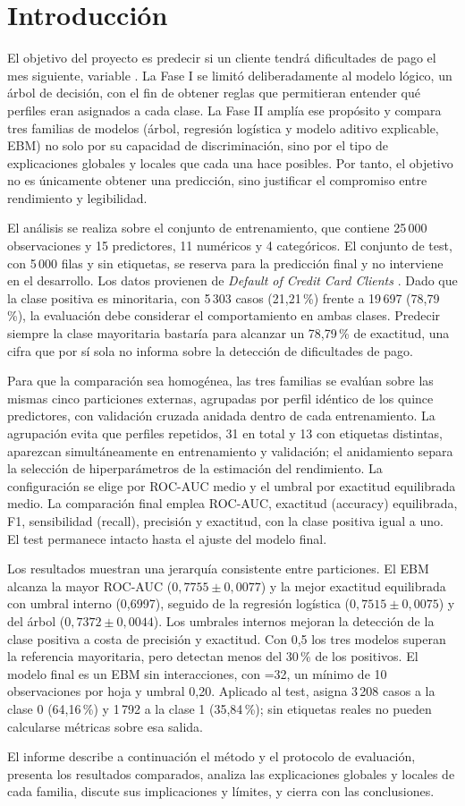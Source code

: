 \section{Introducción}\label{sec:intro}

El objetivo del proyecto es predecir si un cliente tendrá dificultades de pago el mes siguiente, variable . La Fase I se limitó deliberadamente al modelo lógico, un árbol de decisión, con el fin de obtener reglas que permitieran entender qué perfiles eran asignados a cada clase. La Fase II amplía ese propósito y compara tres familias de modelos (árbol, regresión logística y modelo aditivo explicable, EBM) no solo por su capacidad de discriminación, sino por el tipo de explicaciones globales y locales que cada una hace posibles. Por tanto, el objetivo no es únicamente obtener una predicción, sino justificar el compromiso entre rendimiento y legibilidad.

El análisis se realiza sobre el conjunto de entrenamiento, que contiene 25\,000 observaciones y 15 predictores, 11 numéricos y 4 categóricos. El conjunto de test, con 5\,000 filas y sin etiquetas, se reserva para la predicción final y no interviene en el desarrollo. Los datos provienen de \emph{Default of Credit Card Clients} \cite{uci}. Dado que la clase positiva es minoritaria, con 5\,303 casos (21,21\,\%) frente a 19\,697 (78,79\,\%), la evaluación debe considerar el comportamiento en ambas clases. Predecir siempre la clase mayoritaria bastaría para alcanzar un 78,79\,\% de exactitud, una cifra que por sí sola no informa sobre la detección de dificultades de pago.

Para que la comparación sea homogénea, las tres familias se evalúan sobre las mismas cinco particiones externas, agrupadas por perfil idéntico de los quince predictores, con validación cruzada anidada dentro de cada entrenamiento. La agrupación evita que perfiles repetidos, 31 en total y 13 con etiquetas distintas, aparezcan simultáneamente en entrenamiento y validación; el anidamiento separa la selección de hiperparámetros de la estimación del rendimiento. La configuración se elige por ROC-AUC medio y el umbral por exactitud equilibrada medio. La comparación final emplea ROC-AUC, exactitud (accuracy) equilibrada, F1, sensibilidad (recall), precisión y exactitud, con la clase positiva igual a uno. El test permanece intacto hasta el ajuste del modelo final.

Los resultados muestran una jerarquía consistente entre particiones. El EBM alcanza la mayor ROC-AUC ($0{,}7755 \pm 0{,}0077$) y la mejor exactitud equilibrada con umbral interno (0,6997), seguido de la regresión logística ($0{,}7515 \pm 0{,}0075$) y del árbol ($0{,}7372 \pm 0{,}0044$). Los umbrales internos mejoran la detección de la clase positiva a costa de precisión y exactitud. Con 0,5 los tres modelos superan la referencia mayoritaria, pero detectan menos del 30\,\% de los positivos. El modelo final es un EBM sin interacciones, con =32, un mínimo de 10 observaciones por hoja y umbral 0,20. Aplicado al test, asigna 3\,208 casos a la clase 0 (64,16\,\%) y 1\,792 a la clase 1 (35,84\,\%); sin etiquetas reales no pueden calcularse métricas sobre esa salida.

El informe describe a continuación el método y el protocolo de evaluación, presenta los resultados comparados, analiza las explicaciones globales y locales de cada familia, discute sus implicaciones y límites, y cierra con las conclusiones.
